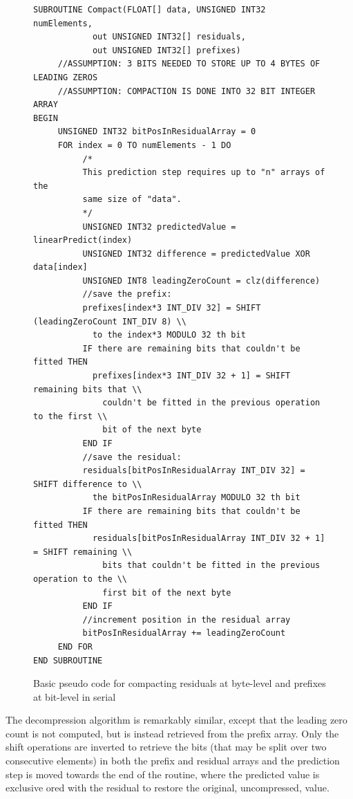 \begin{figure}[ht!]
\begin{mdframed}
\begin{verbatim}
SUBROUTINE Compact(FLOAT[] data, UNSIGNED INT32 numElements, 
		    out UNSIGNED INT32[] residuals, 
		    out UNSIGNED INT32[] prefixes)
	 //ASSUMPTION: 3 BITS NEEDED TO STORE UP TO 4 BYTES OF LEADING ZEROS
	 //ASSUMPTION: COMPACTION IS DONE INTO 32 BIT INTEGER ARRAY
BEGIN
	 UNSIGNED INT32 bitPosInResidualArray = 0
	 FOR index = 0 TO numElements - 1 DO
		  /*
		  This prediction step requires up to "n" arrays of the 
		  same size of "data".
		  */
		  UNSIGNED INT32 predictedValue = linearPredict(index) 
		  UNSIGNED INT32 difference = predictedValue XOR data[index]
		  UNSIGNED INT8 leadingZeroCount = clz(difference)
		  //save the prefix:
		  prefixes[index*3 INT_DIV 32] = SHIFT (leadingZeroCount INT_DIV 8) \\
		    to the index*3 MODULO 32 th bit
		  IF there are remaining bits that couldn't be fitted THEN
		    prefixes[index*3 INT_DIV 32 + 1] = SHIFT remaining bits that \\ 
		      couldn't be fitted in the previous operation to the first \\
		      bit of the next byte
		  END IF
		  //save the residual:
		  residuals[bitPosInResidualArray INT_DIV 32] = SHIFT difference to \\
		    the bitPosInResidualArray MODULO 32 th bit
		  IF there are remaining bits that couldn't be fitted THEN
		    residuals[bitPosInResidualArray INT_DIV 32 + 1] = SHIFT remaining \\
		      bits that couldn't be fitted in the previous operation to the \\
		      first bit of the next byte
		  END IF  
		  //increment position in the residual array
		  bitPosInResidualArray += leadingZeroCount
	 END FOR
END SUBROUTINE 
\end{verbatim}
\caption[Compaction algorithm pseudo code]{Basic pseudo code for compacting residuals at byte-level and prefixes at bit-level in serial}
\label{BASIC_PSEUDO}
\end{mdframed}
\end{figure}

The decompression algorithm is remarkably similar, except that the leading zero count is not computed, but is instead retrieved from the prefix array. Only the shift
operations are inverted to retrieve the bits (that may be split over two consecutive elements) in both the prefix and residual arrays and the prediction step is moved towards
the end of the routine, where the predicted value is exclusive ored with the residual to restore the original, uncompressed, value.

